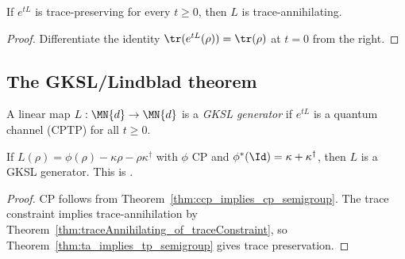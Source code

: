 \begin{theorem}
    \label{thm:tp_semigroup_implies_ta}
    \leanok
    If $e^{tL}$ is trace-preserving for every $t \ge 0$, then $L$ is
    trace-annihilating.
\end{theorem}

\begin{proof}
    \leanok
    Differentiate the identity $\tr(e^{tL}(\rho))=\tr(\rho)$ at $t=0$
    from the right.
\end{proof}

\subsection{The GKSL/Lindblad theorem}

\begin{definition}\label{def:is_gksl_generator}
    \leanok
    A linear map $L : \MN{d} \to \MN{d}$ is a \emph{GKSL generator}
    if $e^{tL}$ is a quantum channel (CPTP) for all $t \ge 0$.
\end{definition}

\begin{theorem}
    \label{thm:gksl_of_generatorDecomp}
    \leanok
    If $L(\rho)=\phi(\rho)-\kappa\rho-\rho\kappa^\dagger$ with
    $\phi$ CP and $\phi^*(\Id)=\kappa+\kappa^\dagger$,
    then $L$ is a GKSL generator.
    This is \cite[Theorem~7.1, Equation~(7.20)]{Wolf2012Quantum}.
\end{theorem}

\begin{proof}
    \leanok
    CP follows from Theorem~\ref{thm:ccp_implies_cp_semigroup}.
    The trace constraint implies trace-annihilation by
    Theorem~\ref{thm:traceAnnihilating_of_traceConstraint}, so
    Theorem~\ref{thm:ta_implies_tp_semigroup} gives trace preservation.
\end{proof}


